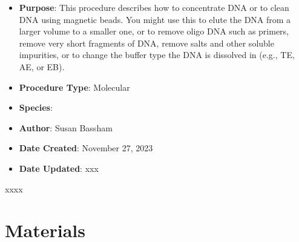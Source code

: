 \documentclass[
  letterpaper,
  DIV=11,
  numbers=noendperiod]{scrreprt}
\providecommand{\tightlist}{%
  \setlength{\itemsep}{0pt}\setlength{\parskip}{0pt}}\usepackage{longtable,booktabs,array}
\begin{document}
\begin{itemize}
\tightlist
\item
  \textbf{Purpose}: This procedure describes how to concentrate DNA or
  to clean DNA using magnetic beads. You might use this to elute the DNA
  from a larger volume to a smaller one, or to remove oligo DNA such as
  primers, remove very short fragments of DNA, remove salts and other
  soluble impurities, or to change the buffer type the DNA is dissolved
  in (e.g., TE, AE, or EB).
\item
  \textbf{Procedure Type}: Molecular
\item
  \textbf{Species}:
\item
  \textbf{Author}: Susan Bassham
\item
  \textbf{Date Created}: November 27, 2023
\item
  \textbf{Date Updated}: xxx
\end{itemize}

\begin{tcolorbox}[enhanced jigsaw, toprule=.15mm, breakable, coltitle=black, leftrule=.75mm, title=\textcolor{quarto-callout-warning-color}{\faExclamationTriangle}\hspace{0.5em}{NOTES}, bottomrule=.15mm, toptitle=1mm, bottomtitle=1mm, colframe=quarto-callout-warning-color-frame, opacityback=0, colback=white, opacitybacktitle=0.6, colbacktitle=quarto-callout-warning-color!10!white, rightrule=.15mm, titlerule=0mm, arc=.35mm, left=2mm]

xxxx

\end{tcolorbox}

\hypertarget{materials-19}{%
\section{Materials}\label{materials-19}}
\end{document}
